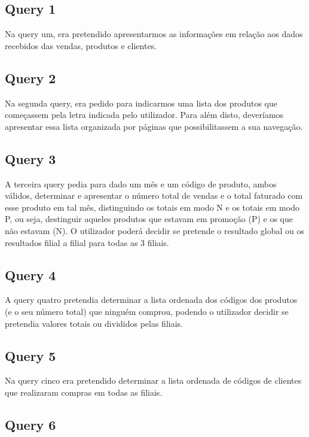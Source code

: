 \documentclass[a4paper,11pt]{report}
\begin{document}
\subsection*{Query 1}
\label{sec:Query1}

Na query um, era pretendido apresentarmos as informações em relação aos dados recebidos das vendas, produtos e clientes.

\subsection*{Query 2}
\label{sec:Query2}

Na segunda query, era pedido para indicarmos uma lista dos produtos que começassem pela letra indicada pelo utilizador. Para além disto, deveríamos apresentar essa lista organizada por páginas que possibilitassem a sua navegação.


\subsection*{Query 3}
\label{sec:Query3}

A terceira query pedia para dado um mês e um código de produto, ambos válidos, determinar e apresentar o número total de vendas e o total faturado com esse produto em tal mês, distinguindo os totais em modo N e os totais em modo P, ou seja, destinguir aqueles produtos que estavam em promoção (P) e os que não estavam (N).
O utilizador poderá decidir se pretende o resultado global ou os resultados filial a filial para todas as 3 filiais.

\subsection*{Query 4}
\label{sec:Query4}

A query quatro pretendia determinar a lista ordenada dos códigos dos produtos (e o seu número total) que ninguém comprou, podendo o utilizador decidir se pretendia valores totais ou divididos pelas filiais.

\subsection*{Query 5}
\label{sec:Query5}

Na query cinco era pretendido determinar a lista ordenada de códigos de clientes que realizaram compras em todas as filiais.

\subsection*{Query 6}
\label{sec:Query6}
\end{document}
